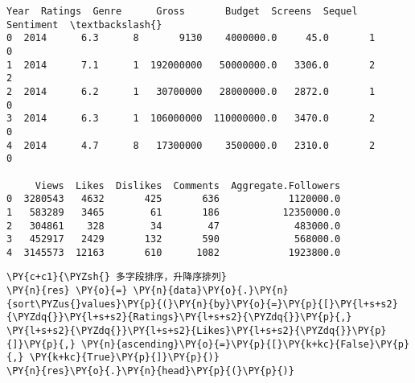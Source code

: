             \begin{tcolorbox}[breakable, size=fbox, boxrule=.5pt, pad at break*=1mm, opacityfill=0]
\begin{Verbatim}[commandchars=\\\{\}]
   Year  Ratings  Genre      Gross       Budget  Screens  Sequel  Sentiment  \textbackslash{}
0  2014      6.3      8       9130    4000000.0     45.0       1          0
1  2014      7.1      1  192000000   50000000.0   3306.0       2          2
2  2014      6.2      1   30700000   28000000.0   2872.0       1          0
3  2014      6.3      1  106000000  110000000.0   3470.0       2          0
4  2014      4.7      8   17300000    3500000.0   2310.0       2          0

     Views  Likes  Dislikes  Comments  Aggregate.Followers
0  3280543   4632       425       636            1120000.0
1   583289   3465        61       186           12350000.0
2   304861    328        34        47             483000.0
3   452917   2429       132       590             568000.0
4  3145573  12163       610      1082            1923800.0
\end{Verbatim}
\end{tcolorbox}
        
    \begin{tcolorbox}[breakable, size=fbox, boxrule=1pt, pad at break*=1mm,colback=cellbackground, colframe=cellborder]
\begin{Verbatim}[commandchars=\\\{\}]
\PY{c+c1}{\PYZsh{} 多字段排序，升降序排列}
\PY{n}{res} \PY{o}{=} \PY{n}{data}\PY{o}{.}\PY{n}{sort\PYZus{}values}\PY{p}{(}\PY{n}{by}\PY{o}{=}\PY{p}{[}\PY{l+s+s2}{\PYZdq{}}\PY{l+s+s2}{Ratings}\PY{l+s+s2}{\PYZdq{}}\PY{p}{,} \PY{l+s+s2}{\PYZdq{}}\PY{l+s+s2}{Likes}\PY{l+s+s2}{\PYZdq{}}\PY{p}{]}\PY{p}{,} \PY{n}{ascending}\PY{o}{=}\PY{p}{[}\PY{k+kc}{False}\PY{p}{,} \PY{k+kc}{True}\PY{p}{]}\PY{p}{)}
\PY{n}{res}\PY{o}{.}\PY{n}{head}\PY{p}{(}\PY{p}{)}
\end{Verbatim}
\end{tcolorbox}

